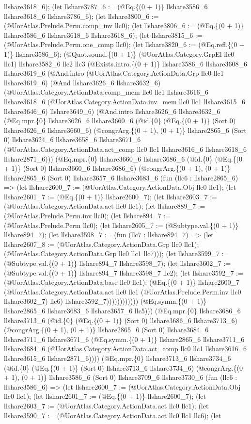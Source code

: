 \documentclass[11pt]{article}
\begin{document}
llshare3618\_6); (let llshare3787\_6 := (@Eq.\{(0 + 1)\} llshare3586\_6 llshare3618\_6 llshare3786\_6); (let llshare3800\_6 := (@UorAtlas.Prelude.Perm.comp\_inv llc0); (let llshare3806\_6 := (@Eq.\{(0 + 1)\} llshare3586\_6 llshare3618\_6 llshare3618\_6); (let llshare3815\_6 := (@UorAtlas.Prelude.Perm.one\_comp llc0); (let llshare3820\_6 := (@Eq.refl.\{(0 + 1)\} llshare3586\_6); (@Quot.sound.\{(0 + 1)\} (@UorAtlas.Category.GrpEl llc0 llc1) llshare3582\_6 llc2 llc3 (@Exists.intro.\{(0 + 1)\} llshare3586\_6 llshare3608\_6 llshare3619\_6 (@And.intro (@UorAtlas.Category.ActionData.Grp llc0 llc1 llshare3619\_6) (@And llshare3626\_6 llshare3632\_6) (@UorAtlas.Category.ActionData.comp\_mem llc0 llc1 llshare3616\_6 llshare3618\_6 (@UorAtlas.Category.ActionData.inv\_mem llc0 llc1 llshare3615\_6 llshare3646\_6) llshare3649\_6) (@And.intro llshare3626\_6 llshare3632\_6 (@Eq.mpr.\{0\} llshare3626\_6 llshare3660\_6 (@id.\{0\} (@Eq.\{(0 + 1)\} (Sort 0) llshare3626\_6 llshare3660\_6) (@congrArg.\{(0 + 1), (0 + 1)\} llshare2865\_6 (Sort 0) llshare3624\_6 llshare3658\_6 llshare3671\_6 (@UorAtlas.Category.ActionData.act\_comp llc0 llc1 llshare3616\_6 llshare3618\_6 llshare2871\_6))) (@Eq.mpr.\{0\} llshare3660\_6 llshare3686\_6 (@id.\{0\} (@Eq.\{(0 + 1)\} (Sort 0) llshare3660\_6 llshare3686\_6) (@congrArg.\{(0 + 1), (0 + 1)\} llshare2865\_6 (Sort 0) llshare3657\_6 llshare3683\_6 (fun (llc6 : llshare2865\_6) => (let llshare2600\_7 := (@UorAtlas.Category.ActionData.Obj llc0 llc1); (let llshare2601\_7 := (@Eq.\{(0 + 1)\} llshare2600\_7); (let llshare2603\_7 := (@UorAtlas.Category.ActionData.act llc0 llc1); (let llshare889\_7 := (@UorAtlas.Prelude.Perm.inv llc0); (let llshare894\_7 := (@UorAtlas.Prelude.Perm llc0); (let llshare2605\_7 := (@Subtype.val.\{(0 + 1)\} llshare894\_7); (let llshare3598\_7 := (fun (llc7 : llshare894\_7) => (let llshare2607\_8 := (@UorAtlas.Category.ActionData.Grp llc0 llc1); (@UorAtlas.Category.ActionData.Grp llc0 llc1 llc7))); (let llshare3599\_7 := (@Subtype.val.\{(0 + 1)\} llshare894\_7 llshare3598\_7); (let llshare3602\_7 := (@Subtype.val.\{(0 + 1)\} llshare894\_7 llshare3598\_7 llc2); (let llshare3592\_7 := (@UorAtlas.Category.ActionData.base llc0 llc1); (@Eq.\{(0 + 1)\} llshare2600\_7 (@UorAtlas.Category.ActionData.act llc0 llc1 (@UorAtlas.Prelude.Perm.inv llc0 llshare3602\_7) llc6) llshare3592\_7)))))))))))) (@Eq.symm.\{(0 + 1)\} llshare2865\_6 llshare3683\_6 llshare3657\_6 llc5))) (@Eq.mpr.\{0\} llshare3686\_6 llshare3713\_6 (@id.\{0\} (@Eq.\{(0 + 1)\} (Sort 0) llshare3686\_6 llshare3713\_6) (@congrArg.\{(0 + 1), (0 + 1)\} llshare2865\_6 (Sort 0) llshare3684\_6 llshare3711\_6 llshare3671\_6 (@Eq.symm.\{(0 + 1)\} llshare2865\_6 llshare3711\_6 llshare3684\_6 (@UorAtlas.Category.ActionData.act\_comp llc0 llc1 llshare3616\_6 llshare3615\_6 llshare2871\_6)))) (@Eq.mpr.\{0\} llshare3713\_6 llshare3734\_6 (@id.\{0\} (@Eq.\{(0 + 1)\} (Sort 0) llshare3713\_6 llshare3734\_6) (@congrArg.\{(0 + 1), (0 + 1)\} llshare3586\_6 (Sort 0) llshare3709\_6 llshare3730\_6 (fun (llc6 : llshare3586\_6) => (let llshare2600\_7 := (@UorAtlas.Category.ActionData.Obj llc0 llc1); (let llshare2601\_7 := (@Eq.\{(0 + 1)\} llshare2600\_7); (let llshare2603\_7 := (@UorAtlas.Category.ActionData.act llc0 llc1); (let llshare3590\_7 := (@UorAtlas.Category.ActionData.act llc0 llc1 llc6); (let 
\end{document}
